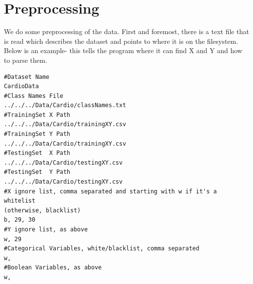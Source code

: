\section{Preprocessing}
We do some preprocessing of the data.  First and foremost, there is a text file
that is read which describes the dataset and points to where it is on the
filesystem.  Below is an example- this tells the program where it can find X and
Y and how to parse them.\pagebreak
\begin{lstlisting}[language=config, caption={Cardio Config File}, label={fig:config}]
#Dataset Name
CardioData
#Class Names File
../../../Data/Cardio/classNames.txt
#TrainingSet X Path
../../../Data/Cardio/trainingXY.csv
#TrainingSet Y Path
../../../Data/Cardio/trainingXY.csv
#TestingSet  X Path
../../../Data/Cardio/testingXY.csv
#TestingSet  Y Path
../../../Data/Cardio/testingXY.csv
#X ignore list, comma separated and starting with w if it's a whitelist
(otherwise, blacklist)
b, 29, 30
#Y ignore list, as above
w, 29
#Categorical Variables, white/blacklist, comma separated
w, 
#Boolean Variables, as above
w, 
\end{lstlisting}

